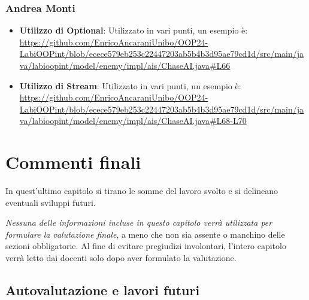 \documentclass[a4paper,12pt]{report}
\begin{document}
\subsection{Andrea Monti}
\begin{itemize}
	\item \textbf{Utilizzo di Optional}: Utilizzato in vari punti, un esempio è: \url{https://github.com/EnricoAncaraniUnibo/OOP24-LabiOOPint/blob/ecece579eb253c22447203ab5b4b3d95ae79cd1d/src/main/java/labioopint/model/enemy/impl/ais/ChaseAI.java#L66}
	\item \textbf{Utilizzo di Stream}: Utilizzato in vari punti, un esempio è: \url{https://github.com/EnricoAncaraniUnibo/OOP24-LabiOOPint/blob/ecece579eb253c22447203ab5b4b3d95ae79cd1d/src/main/java/labioopint/model/enemy/impl/ais/ChaseAI.java#L68-L70}
\end{itemize}

\chapter{Commenti finali}

In quest'ultimo capitolo si tirano le somme del lavoro svolto e si delineano eventuali sviluppi
futuri.

\textit{Nessuna delle informazioni incluse in questo capitolo verrà utilizzata per formulare la valutazione finale}, a meno che non sia assente o manchino delle sezioni obbligatorie.
%
Al fine di evitare pregiudizi involontari, l'intero capitolo verrà letto dai docenti solo dopo aver formulato la valutazione.

\section{Autovalutazione e lavori futuri}
\end{document}
